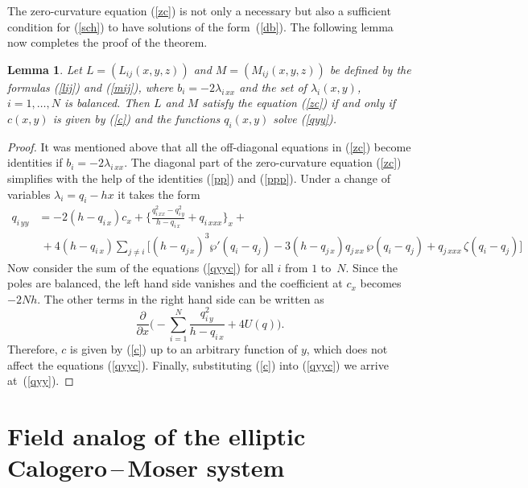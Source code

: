 \documentclass[a4paper,11pt]{article}
\newcommand{\p}{\partial}
\theoremstyle{plain}
\newtheorem{lem}{Lemma}
\theoremstyle{remark}
\begin{document}
The zero-curvature equation (\ref{zc}) is not only a necessary but
also a sufficient condition for (\ref{sch}) to have solutions of
the form~(\ref{db}). The following lemma now completes the proof
of the theorem.
\begin{lem}
Let $L=(L_{ij}(x,y,z))$ and $M=(M_{ij}(x,y,z))$ be defined by the formulas
\emph{(\ref{lij})} and \emph{(\ref{mij})}, where
$b_i=-2\lambda_{i\,xx}$ and the set of $\lambda_i(x,y)$, $i=1,\dots, N$
is balanced. Then $L$ and $M$ satisfy the equation \emph{(\ref{zc})}
if and only if $c(x,y)$ is given by \emph{(\ref{c})} and the
functions $q_i(x,y)$ solve \emph{(\ref{qyy})}.
\end{lem}
\begin{proof}
It was mentioned above that all the off-diagonal equations in (\ref{zc}) become
identities if $b_i=-2\lambda_{i\,xx}$.
The diagonal part of the zero-curvature equation (\ref{zc}) simplifies with
the help of the identities (\ref{pp}) and (\ref{ppp}). Under a change
of variables $\lambda_i=q_i-h x$ it takes the form
\begin{equation}\label{qyyc}
\begin{aligned}
q_{i\,yy} &= -2(h-q_{i\,x})c_x+\biggl\{
\frac{q_{i\,xx}^2-q_{i\,y}^2}{h-q_{i\,x}} +q_{i\,xxx}
\biggr\}_{\!x}+{}\\
{}&\ {}+4(h-q_{i\,x}) \sum_{j\ne i} \bigl[ (h-q_{j\,x})^3 \wp'(q_i-q_j)
-3(h-q_{j\,x})q_{j\,xx}\,\wp(q_i-q_j)+q_{j\,xxx}\,\zeta(q_i-q_j) \bigr]
\end{aligned}
\end{equation}
Now consider the sum of the equations (\ref{qyyc}) for all $i$ from $1$ to~$N$.
Since the poles are balanced, the left hand side vanishes
and the coefficient at $c_x$ becomes $-2Nh$.
The other terms in the right hand side can be written as
$$
\frac{\p}{\p x} \biggl(
-\sum_{i=1}^N \frac{q_{i\,y}^2}{h-q_{i\,x}}+4U(q) \biggr) .
$$
Therefore, $c$ is given by (\ref{c}) up to an arbitrary function of $y$, which
does not affect the equations (\ref{qyyc}). Finally, substituting (\ref{c})
into (\ref{qyyc}) we arrive at~(\ref{qyy}).
\end{proof}


\section{Field analog of the elliptic Calogero\,--\,Moser system}
\end{document}
